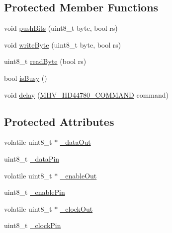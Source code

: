 \subsection*{\-Protected \-Member \-Functions}
\begin{DoxyCompactItemize}
\item 
void \hyperlink{class_m_h_v___display___h_d44780___shift___register_a24e29c1cec86368c3e42bdf871a6f68d}{push\-Bits} (uint8\-\_\-t byte, bool rs)
\item 
void \hyperlink{class_m_h_v___display___h_d44780___shift___register_a34da17fc30876b5be697c6515a9a8b29}{write\-Byte} (uint8\-\_\-t byte, bool rs)
\item 
uint8\-\_\-t \hyperlink{class_m_h_v___display___h_d44780___shift___register_a2d3cd6330de50850ee2500c51cfb9864}{read\-Byte} (bool rs)
\item 
bool \hyperlink{class_m_h_v___display___h_d44780___shift___register_a39ad131326358bd4c512117f1f40ed08}{is\-Busy} ()
\item 
void \hyperlink{class_m_h_v___display___h_d44780___shift___register_a5f396630acf45e37a766ae9ae18b6508}{delay} (\hyperlink{_m_h_v___display___h_d44780_8h_a76bff68a0c366080486a09e3beec77e1}{\-M\-H\-V\-\_\-\-H\-D44780\-\_\-\-C\-O\-M\-M\-A\-N\-D} command)
\end{DoxyCompactItemize}
\subsection*{\-Protected \-Attributes}
\begin{DoxyCompactItemize}
\item 
volatile uint8\-\_\-t $\ast$ \hyperlink{class_m_h_v___display___h_d44780___shift___register_a1ef9590349f13740a07da6cde46f7501}{\-\_\-data\-Out}
\item 
uint8\-\_\-t \hyperlink{class_m_h_v___display___h_d44780___shift___register_aaaa37dbda3bf202fb52c9a3f56a2ebe8}{\-\_\-data\-Pin}
\item 
volatile uint8\-\_\-t $\ast$ \hyperlink{class_m_h_v___display___h_d44780___shift___register_a54c5007b675ae06da9e3301f8020137f}{\-\_\-enable\-Out}
\item 
uint8\-\_\-t \hyperlink{class_m_h_v___display___h_d44780___shift___register_a9dc7266b1f5940d91d7c374cc69c192d}{\-\_\-enable\-Pin}
\item 
volatile uint8\-\_\-t $\ast$ \hyperlink{class_m_h_v___display___h_d44780___shift___register_a466356fc79c931923a20003dec3cb051}{\-\_\-clock\-Out}
\item 
uint8\-\_\-t \hyperlink{class_m_h_v___display___h_d44780___shift___register_a166569c75b144383a553a35a10a60221}{\-\_\-clock\-Pin}
\end{DoxyCompactItemize}


